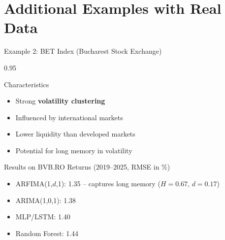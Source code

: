 \documentclass[9pt, aspectratio=169, t]{beamer}
\begin{document}
\section{Additional Examples with Real Data}

\begin{frame}{Example 2: BET Index (Bucharest Stock Exchange)}
    \begin{cminipage}{0.95\textwidth}
    \begin{block}{Characteristics}
        \begin{itemize}\setlength{\itemsep}{0pt}
            \item Strong \textbf{volatility clustering}
            \item Influenced by international markets
            \item Lower liquidity than developed markets
            \item Potential for long memory in volatility
        \end{itemize}
    \end{block}

    \vspace{0.2cm}

    \begin{exampleblock}{Results on BVB.RO Returns (2019--2025, RMSE in \%)}
        \begin{itemize}\setlength{\itemsep}{0pt}
            \item ARFIMA(1,$d$,1): 1.35 -- captures long memory ($H = 0.67$, $d = 0.17$)
            \item ARIMA(1,0,1): 1.38
            \item MLP/LSTM: 1.40
            \item Random Forest: 1.44
        \end{itemize}
    \end{exampleblock}
    \end{cminipage}
\end{frame}
\end{document}
